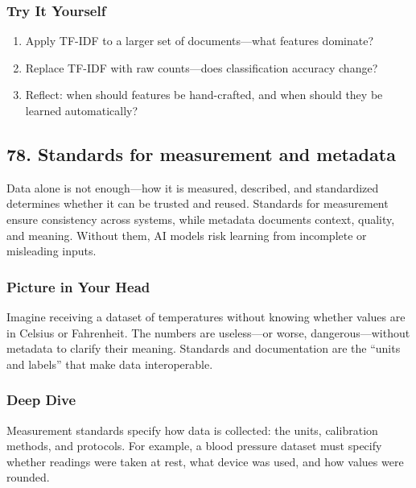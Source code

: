 \documentclass[
  letterpaper,
  DIV=11,
  numbers=noendperiod]{scrreprt}
\providecommand{\tightlist}{%
  \setlength{\itemsep}{0pt}\setlength{\parskip}{0pt}}
\begin{document}
\subsubsection{Try It Yourself}\label{try-it-yourself-76}

\begin{enumerate}
\def\labelenumi{\arabic{enumi}.}
\tightlist
\item
  Apply TF-IDF to a larger set of documents---what features dominate?
\item
  Replace TF-IDF with raw counts---does classification accuracy change?
\item
  Reflect: when should features be hand-crafted, and when should they be
  learned automatically?
\end{enumerate}

\subsection{78. Standards for measurement and
metadata}\label{standards-for-measurement-and-metadata}

Data alone is not enough---how it is measured, described, and
standardized determines whether it can be trusted and reused. Standards
for measurement ensure consistency across systems, while metadata
documents context, quality, and meaning. Without them, AI models risk
learning from incomplete or misleading inputs.

\subsubsection{Picture in Your Head}\label{picture-in-your-head-77}

Imagine receiving a dataset of temperatures without knowing whether
values are in Celsius or Fahrenheit. The numbers are useless---or worse,
dangerous---without metadata to clarify their meaning. Standards and
documentation are the ``units and labels'' that make data interoperable.

\subsubsection{Deep Dive}\label{deep-dive-77}

Measurement standards specify how data is collected: the units,
calibration methods, and protocols. For example, a blood pressure
dataset must specify whether readings were taken at rest, what device
was used, and how values were rounded.
\end{document}
